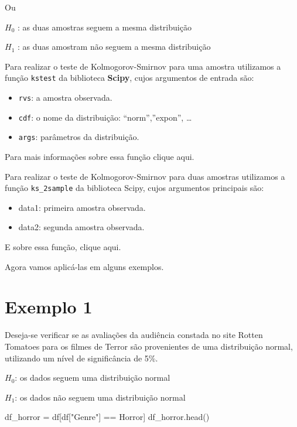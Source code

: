\documentclass[
  letterpaper,
  DIV=11,
  numbers=noendperiod]{scrreprt}
\newenvironment{Shaded}{\begin{snugshade}}{\end{snugshade}}
\newcommand{\NormalTok}[1]{\textcolor[rgb]{0.00,0.23,0.31}{#1}}
\newcommand{\OperatorTok}[1]{\textcolor[rgb]{0.37,0.37,0.37}{#1}}
\newcommand{\StringTok}[1]{\textcolor[rgb]{0.13,0.47,0.30}{#1}}
\providecommand{\tightlist}{%
  \setlength{\itemsep}{0pt}\setlength{\parskip}{0pt}}\usepackage{longtable,booktabs,array}
\begin{document}
Ou

\(H_{0}\) : as duas amostras seguem a mesma distribuição

\(H_{1}\) : as duas amostram não seguem a mesma distribuição

Para realizar o teste de Kolmogorov-Smirnov para uma amostra utilizamos
a função \texttt{kstest} da biblioteca \textbf{Scipy}, cujos argumentos
de entrada são:

\begin{itemize}
\tightlist
\item
  \texttt{rvs}: a amostra observada.
\item
  \texttt{cdf}: o nome da distribuição: ``norm'',''expon'', \ldots{}
\item
  \texttt{args}: parâmetros da distribuição.
\end{itemize}

Para mais informações sobre essa função clique aqui.

Para realizar o teste de Kolmogorov-Smirnov para duas amostras
utilizamos a função \texttt{ks\_2sample} da biblioteca Scipy, cujos
argumentos principais são:

\begin{itemize}
\tightlist
\item
  data1: primeira amostra observada.
\item
  data2: segunda amostra observada.
\end{itemize}

E sobre essa função, clique aqui.

Agora vamos aplicá-las em alguns exemplos.

\hypertarget{exemplo-1-6}{%
\section{Exemplo 1}\label{exemplo-1-6}}

Deseja-se verificar se as avaliações da audiência constada no site
Rotten Tomatoes para os filmes de Terror são provenientes de uma
distribuição normal, utilizando um nível de significância de 5\%.

\(H_{0}\): os dados seguem uma distribuição normal

\(H_{1}\): os dados não seguem uma distribuição normal

\begin{Shaded}
\begin{Highlighting}[]
\NormalTok{df\_horror }\OperatorTok{=}\NormalTok{ df[df[}\StringTok{"Genre"}\NormalTok{] }\OperatorTok{==} \StringTok{\textquotesingle{}Horror\textquotesingle{}}\NormalTok{]}
\NormalTok{df\_horror.head()}
\end{Highlighting}
\end{Shaded}
\end{document}
